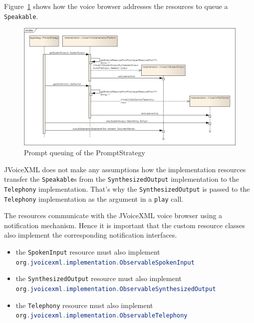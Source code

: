 \documentclass[11pt,a4paper]{article}
\begin{document}
Figure~\ref{fig:play} shows how the voice browser addresses the resources to
queue a \lstinline[language=Java]{Speakable}.
\begin{figure}[htp]
\begin{center}
  \includegraphics[width=\linewidth]{sd-play}
  \caption{Prompt queuing of the PromptStrategy}
  \label{fig:play}
\end{center}
\end{figure}
JVoiceXML does not make any assumptions how the implementation resources
transfer the \lstinline[language=Java]{Speakable}s from the
\lstinline[language=Java]{SynthesizedOutput} implementation to the
\lstinline[language=Java]{Telephony} implementation. That's why the
\lstinline[language=Java]{SynthesizedOutput} is passed to the
\lstinline[language=Java]{Telephony} implementation as the argument in a
\lstinline[language=Java]{play} call.

The resources communicate with the JVoiceXML voice browser using a
notification mechanism. Hence it is important that the custom resource classes also implement
the corresponding notification interfaces.

\begin{itemize}
  \item the \lstinline[language=Java]{SpokenInput} resource must also implement
  \\
  \lstinline[language=Java]{org.jvoicexml.implementation.ObservableSpokenInput}
  \item the \lstinline[language=Java]{SynthesizedOutput} resource must also
  implement \\
  \lstinline[language=Java]{org.jvoicexml.implementation.ObservableSynthesizedOutput}
  \item the \lstinline[language=Java]{Telephony} resource must also implement \\
  \lstinline[language=Java]{org.jvoicexml.implementation.ObservableTelephony}
\end{itemize}
\end{document}
